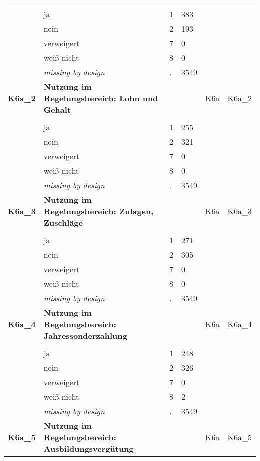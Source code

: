 \begin{longtable}{| L{2.45cm} | L{6cm} | C{1.5cm} | R{1cm} | C{2.25cm} | C{2.25cm} |}
   &  &  &  &  &  \\ 
   & ja & 1 & 383 &  &  \\ 
   & nein & 2 & 193 &  &  \\ 
   & verweigert & 7 & 0 &  &  \\ 
   & weiß nicht & 8 & 0 &  &  \\ 
   & \textit{missing by design} & \textit{.} & 3549 &  &  \\ 
   \midrule
\textbf{K6a\_2}\label{var:K6a:2} & \textbf{Nutzung im Regelungsbereich: Lohn und Gehalt} &  &  & \hyperref[K6a]{K6a} & \hyperref[var:suf:K6a:2]{K6a\_2} \\ 
   &  &  &  &  &  \\ 
   & ja & 1 & 255 &  &  \\ 
   & nein & 2 & 321 &  &  \\ 
   & verweigert & 7 & 0 &  &  \\ 
   & weiß nicht & 8 & 0 &  &  \\ 
   & \textit{missing by design} & \textit{.} & 3549 &  &  \\ 
   \midrule
\textbf{K6a\_3}\label{var:K6a:3} & \textbf{Nutzung im Regelungsbereich: Zulagen, Zuschläge} &  &  & \hyperref[K6a]{K6a} & \hyperref[var:suf:K6a:3]{K6a\_3} \\ 
   &  &  &  &  &  \\ 
   & ja & 1 & 271 &  &  \\ 
   & nein & 2 & 305 &  &  \\ 
   & verweigert & 7 & 0 &  &  \\ 
   & weiß nicht & 8 & 0 &  &  \\ 
   & \textit{missing by design} & \textit{.} & 3549 &  &  \\ 
   \midrule
\textbf{K6a\_4}\label{var:K6a:4} & \textbf{Nutzung im Regelungsbereich: Jahressonderzahlung} &  &  & \hyperref[K6a]{K6a} & \hyperref[var:suf:K6a:4]{K6a\_4} \\ 
   &  &  &  &  &  \\ 
   & ja & 1 & 248 &  &  \\ 
   & nein & 2 & 326 &  &  \\ 
   & verweigert & 7 & 0 &  &  \\ 
   & weiß nicht & 8 & 2 &  &  \\ 
   & \textit{missing by design} & \textit{.} & 3549 &  &  \\ 
   \midrule
\textbf{K6a\_5}\label{var:K6a:5} & \textbf{Nutzung im Regelungsbereich: Ausbildungsvergütung} &  &  & \hyperref[K6a]{K6a} & \hyperref[var:suf:K6a:5]{K6a\_5} \\ 

\end{longtable}
